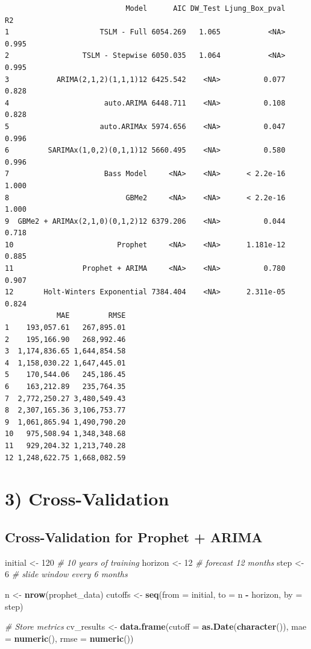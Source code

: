 \documentclass[
]{article}
\newenvironment{Shaded}{\begin{snugshade}}{\end{snugshade}}
\newcommand{\AttributeTok}[1]{\textcolor[rgb]{0.13,0.29,0.53}{#1}}
\newcommand{\CommentTok}[1]{\textcolor[rgb]{0.56,0.35,0.01}{\textit{#1}}}
\newcommand{\DecValTok}[1]{\textcolor[rgb]{0.00,0.00,0.81}{#1}}
\newcommand{\FunctionTok}[1]{\textcolor[rgb]{0.13,0.29,0.53}{\textbf{#1}}}
\newcommand{\NormalTok}[1]{#1}
\newcommand{\OtherTok}[1]{\textcolor[rgb]{0.56,0.35,0.01}{#1}}
\newcommand{\SpecialCharTok}[1]{\textcolor[rgb]{0.81,0.36,0.00}{\textbf{#1}}}
\begin{document}
\begin{verbatim}
                            Model      AIC DW_Test Ljung_Box_pval    R2
1                     TSLM - Full 6054.269   1.065           <NA> 0.995
2                 TSLM - Stepwise 6050.035   1.064           <NA> 0.995
3           ARIMA(2,1,2)(1,1,1)12 6425.542    <NA>          0.077 0.828
4                      auto.ARIMA 6448.711    <NA>          0.108 0.828
5                     auto.ARIMAx 5974.656    <NA>          0.047 0.996
6         SARIMAx(1,0,2)(0,1,1)12 5660.495    <NA>          0.580 0.996
7                      Bass Model     <NA>    <NA>      < 2.2e-16 1.000
8                           GBMe2     <NA>    <NA>      < 2.2e-16 1.000
9  GBMe2 + ARIMAx(2,1,0)(0,1,2)12 6379.206    <NA>          0.044 0.718
10                        Prophet     <NA>    <NA>      1.181e-12 0.885
11                Prophet + ARIMA     <NA>    <NA>          0.780 0.907
12       Holt-Winters Exponential 7384.404    <NA>      2.311e-05 0.824
            MAE         RMSE
1    193,057.61   267,895.01
2    195,166.90   268,992.46
3  1,174,836.65 1,644,854.58
4  1,158,030.22 1,647,445.01
5    170,544.06   245,186.45
6    163,212.89   235,764.35
7  2,772,250.27 3,480,549.43
8  2,307,165.36 3,106,753.77
9  1,061,865.94 1,490,790.20
10   975,508.94 1,348,348.68
11   929,204.32 1,213,740.28
12 1,248,622.75 1,668,082.59
\end{verbatim}

\section{3) Cross-Validation}\label{cross-validation}

\subsection{Cross-Validation for Prophet +
ARIMA}\label{cross-validation-for-prophet-arima}

\begin{Shaded}
\begin{Highlighting}[]
\NormalTok{initial }\OtherTok{\textless{}{-}} \DecValTok{120}  \CommentTok{\# 10 years of training}
\NormalTok{horizon }\OtherTok{\textless{}{-}} \DecValTok{12}  \CommentTok{\# forecast 12 months}
\NormalTok{step }\OtherTok{\textless{}{-}} \DecValTok{6}  \CommentTok{\# slide window every 6 months}

\NormalTok{n }\OtherTok{\textless{}{-}} \FunctionTok{nrow}\NormalTok{(prophet\_data)}
\NormalTok{cutoffs }\OtherTok{\textless{}{-}} \FunctionTok{seq}\NormalTok{(}\AttributeTok{from =}\NormalTok{ initial, }\AttributeTok{to =}\NormalTok{ n }\SpecialCharTok{{-}}\NormalTok{ horizon, }\AttributeTok{by =}\NormalTok{ step)}

\CommentTok{\# Store metrics}
\NormalTok{cv\_results }\OtherTok{\textless{}{-}} \FunctionTok{data.frame}\NormalTok{(}\AttributeTok{cutoff =} \FunctionTok{as.Date}\NormalTok{(}\FunctionTok{character}\NormalTok{()), }\AttributeTok{mae =} \FunctionTok{numeric}\NormalTok{(),}
    \AttributeTok{rmse =} \FunctionTok{numeric}\NormalTok{())}
\end{Highlighting}
\end{Shaded}
\end{document}
